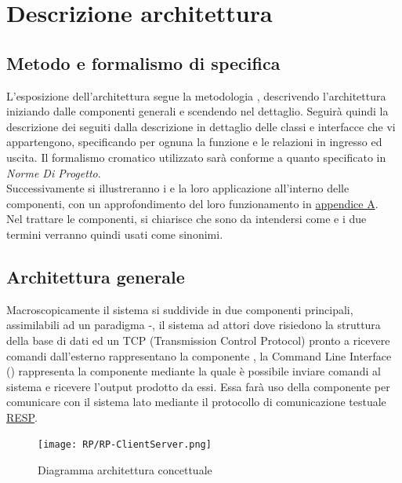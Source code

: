 \documentclass{scalatekids-article}
\begin{document}
\section{Descrizione architettura}

\subsection{Metodo e formalismo di specifica}

L'esposizione dell'architettura segue la metodologia ,
descrivendo l'architettura iniziando dalle componenti generali e scendendo
nel dettaglio. Seguirà quindi la descrizione dei  seguiti dalla descrizione
in dettaglio delle classi e interfacce che vi appartengono, specificando
per ognuna la funzione e le relazioni in ingresso ed uscita. Il formalismo
cromatico utilizzato sarà conforme a quanto specificato in \textit{Norme Di Progetto}.\\
Successivamente si illustreranno i  e la loro applicazione
all'interno delle componenti, con un approfondimento del loro funzionamento
in \hyperref[sec:appendice]{appendice A}.\\
Nel trattare le componenti, si chiarisce che sono da intendersi come 
e i due termini verranno quindi usati come sinonimi.\\

\subsection{Architettura generale}

Macroscopicamente il sistema si suddivide in due componenti principali,
assimilabili ad un paradigma -, il sistema ad attori dove risiedono
la struttura della base di dati ed un  TCP (Transmission Control Protocol)
pronto a ricevere comandi dall'esterno rappresentano la componente , la
Command Line Interface () rappresenta la componente  mediante la quale
è possibile inviare comandi al sistema e ricevere l'output prodotto da essi.
Essa farà uso della componente  per comunicare con il sistema lato
 mediante il protocollo di comunicazione testuale \hyperref[sec:RESP]{RESP}.\\

\begin{figure}[H]
  \begin{center}
    \texttt{[image: RP/RP-ClientServer.png]}
    \caption{Diagramma architettura concettuale}
  \end{center}
\end{figure}
\end{document}
